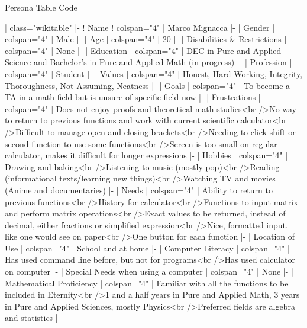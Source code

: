 Persona Table Code

{| class="wikitable" 
|-
! Name
! colspan="4" | Marco Mignacca
|-
| Gender
| colspan="4" | Male
|-
| Age
| colspan="4" | 20
|-
| Disabilities & Restrictions
| colspan="4" | None
|-
| Education
| colspan="4" | DEC in Pure and Applied Science and Bachelor's in Pure and Applied Math (in progress)
|-
| Profession
| colspan="4" | Student
|-
| Values
| colspan="4" | Honest, Hard-Working, Integrity, Thoroughness, Not Assuming, Neatness
|-
| Goals
| colspan="4" | To become a TA in a math field but is unsure of specific field now
|-
| Frustrations
| colspan="4" | Does not enjoy proofs and theoretical math studies<br />No way to return to previous functions and work with current scientific calculator<br />Difficult to manage open and closing brackets<br />Needing to click shift or second function to use some functions<br />Screen is too small on regular calculator, makes it difficult for longer expressions
|-
| Hobbies
| colspan="4" | Drawing and baking<br />Listening to music (mostly pop)<br />Reading (informational texts/learning new things)<br />Watching TV and movies (Anime and documentaries)
|-
| Needs
| colspan="4" | Ability to return to previous functions<br />History for calculator<br />Functions to input matrix and perform matrix operations<br />Exact values to be returned, instead of decimal, either fractions or simplified expression<br />Nice, formatted input, like one would see on paper<br />One button for each function
|-
| Location of Use
| colspan="4" | School and at home
|-
| Computer Literacy
| colspan="4" | Has used command line before, but not for programs<br />Has used calculator on computer
|-
| Special Needs when using a computer
| colspan="4" | None
|-
| Mathematical Proficiency
| colspan="4" | Familiar with all the functions to be included in Eternity<br />1 and a half years in Pure and Applied Math, 3 years in Pure and Applied Sciences, mostly Physics<br />Preferred fields are algebra and statistics
|}
